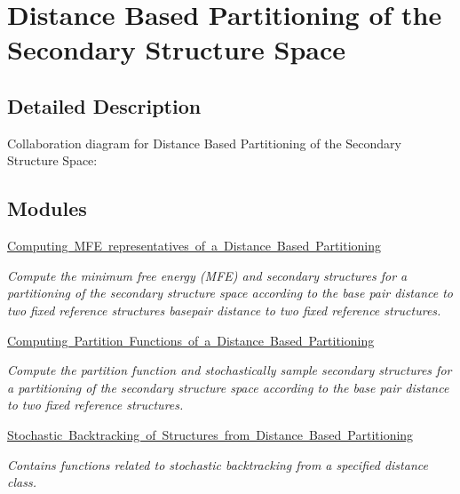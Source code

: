 \hypertarget{group__kl__neighborhood}{}\section{Distance Based Partitioning of the Secondary Structure Space}
\label{group__kl__neighborhood}


\subsection{Detailed Description}
Collaboration diagram for Distance Based Partitioning of the Secondary Structure Space\+:
\subsection*{Modules}
\begin{DoxyCompactItemize}
\item 
\mbox{\hyperlink{group__kl__neighborhood__mfe}{Computing M\+F\+E representatives of a Distance Based Partitioning}}
\begin{DoxyCompactList}\small\item\em Compute the minimum free energy (M\+FE) and secondary structures for a partitioning of the secondary structure space according to the base pair distance to two fixed reference structures basepair distance to two fixed reference structures. \end{DoxyCompactList}\item 
\mbox{\hyperlink{group__kl__neighborhood__pf}{Computing Partition Functions of a Distance Based Partitioning}}
\begin{DoxyCompactList}\small\item\em Compute the partition function and stochastically sample secondary structures for a partitioning of the secondary structure space according to the base pair distance to two fixed reference structures. \end{DoxyCompactList}\item 
\mbox{\hyperlink{group__kl__neighborhood__stochbt}{Stochastic Backtracking of Structures from Distance Based Partitioning}}
\begin{DoxyCompactList}\small\item\em Contains functions related to stochastic backtracking from a specified distance class. \end{DoxyCompactList}\end{DoxyCompactItemize}
